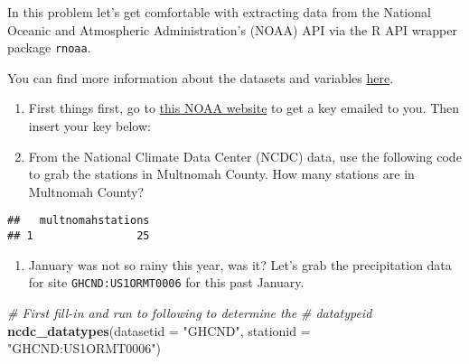 \documentclass[
]{article}
\newenvironment{Shaded}{\begin{snugshade}}{\end{snugshade}}
\newcommand{\AttributeTok}[1]{\textcolor[rgb]{0.13,0.29,0.53}{#1}}
\newcommand{\CommentTok}[1]{\textcolor[rgb]{0.56,0.35,0.01}{\textit{#1}}}
\newcommand{\FunctionTok}[1]{\textcolor[rgb]{0.13,0.29,0.53}{\textbf{#1}}}
\newcommand{\NormalTok}[1]{#1}
\newcommand{\OtherTok}[1]{\textcolor[rgb]{0.56,0.35,0.01}{#1}}
\newcommand{\SpecialCharTok}[1]{\textcolor[rgb]{0.81,0.36,0.00}{\textbf{#1}}}
\newcommand{\StringTok}[1]{\textcolor[rgb]{0.31,0.60,0.02}{#1}}
\providecommand{\tightlist}{%
  \setlength{\itemsep}{0pt}\setlength{\parskip}{0pt}}
\begin{document}
In this problem let's get comfortable with extracting data from the
National Oceanic and Atmospheric Administration's (NOAA) API via the R
API wrapper package \texttt{rnoaa}.

You can find more information about the datasets and variables
\href{https://www.ncdc.noaa.gov/homr/reports}{here}.

\begin{enumerate}
\def\labelenumi{\alph{enumi}.}
\item
  First things first, go to
  \href{https://www.ncdc.noaa.gov/cdo-web/token}{this NOAA website} to
  get a key emailed to you. Then insert your key below:
\item
  From the National Climate Data Center (NCDC) data, use the following
  code to grab the stations in Multnomah County. How many stations are
  in Multnomah County?
\end{enumerate}

\begin{Shaded}
\end{Shaded}

\begin{verbatim}
##   multnomahstations
## 1                25
\end{verbatim}

\begin{enumerate}
\def\labelenumi{\alph{enumi}.}
\setcounter{enumi}{2}
\tightlist
\item
  January was not so rainy this year, was it? Let's grab the
  precipitation data for site \texttt{GHCND:US1ORMT0006} for this past
  January.
\end{enumerate}

\begin{Shaded}
\begin{Highlighting}[]
\CommentTok{\# First fill{-}in and run to following to determine the}
\CommentTok{\# datatypeid}
\FunctionTok{ncdc\_datatypes}\NormalTok{(}\AttributeTok{datasetid =} \StringTok{"GHCND"}\NormalTok{,}
               \AttributeTok{stationid =} \StringTok{"GHCND:US1ORMT0006"}\NormalTok{)}
\end{Highlighting}
\end{Shaded}
\end{document}
